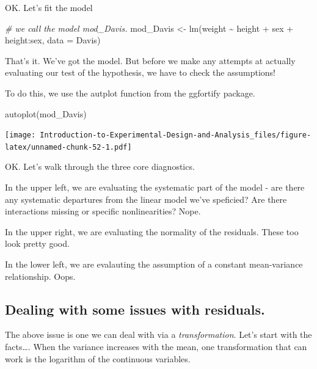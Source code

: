 \documentclass[
]{book}
\newenvironment{Shaded}{\begin{snugshade}}{\end{snugshade}}
\newcommand{\AttributeTok}[1]{\textcolor[rgb]{0.77,0.63,0.00}{#1}}
\newcommand{\CommentTok}[1]{\textcolor[rgb]{0.56,0.35,0.01}{\textit{#1}}}
\newcommand{\FunctionTok}[1]{\textcolor[rgb]{0.00,0.00,0.00}{#1}}
\newcommand{\NormalTok}[1]{#1}
\newcommand{\OtherTok}[1]{\textcolor[rgb]{0.56,0.35,0.01}{#1}}
\newcommand{\SpecialCharTok}[1]{\textcolor[rgb]{0.00,0.00,0.00}{#1}}
\begin{document}
OK. Let's fit the model

\begin{Shaded}
\begin{Highlighting}[]
\CommentTok{\# we call the model mod\_Davis.}
\NormalTok{mod\_Davis }\OtherTok{\textless{}{-}} \FunctionTok{lm}\NormalTok{(weight }\SpecialCharTok{\textasciitilde{}}\NormalTok{ height }\SpecialCharTok{+}\NormalTok{ sex }\SpecialCharTok{+}\NormalTok{ height}\SpecialCharTok{:}\NormalTok{sex, }\AttributeTok{data =}\NormalTok{ Davis)}
\end{Highlighting}
\end{Shaded}

That's it. We've got the model. But before we make any attempts at actually evaluating our test of the hypothesis, we have to check the assumptions!

To do this, we use the autplot function from the ggfortify package.

\begin{Shaded}
\begin{Highlighting}[]
\FunctionTok{autoplot}\NormalTok{(mod\_Davis)}
\end{Highlighting}
\end{Shaded}

\texttt{[image: Introduction-to-Experimental-Design-and-Analysis\_files/figure-latex/unnamed-chunk-52-1.pdf]}

OK. Let's walk through the three core diagnostics.

In the upper left, we are evaluating the systematic part of the model - are there any systematic departures from the linear model we've speficied? Are there interactions missing or specific nonlinearities? Nope.

In the upper right, we are evaluating the normality of the residuals. These too look pretty good.

In the lower left, we are evalauting the assumption of a constant mean-variance relationship. Oops.

\hypertarget{dealing-with-some-issues-with-residuals.}{%
\subsection{Dealing with some issues with residuals.}\label{dealing-with-some-issues-with-residuals.}}

The above issue is one we can deal with via a \emph{transformation}. Let's start with the facts\ldots. When the variance increases with the mean, one transformation that can work is the logarithm of the continuous variables.
\end{document}
